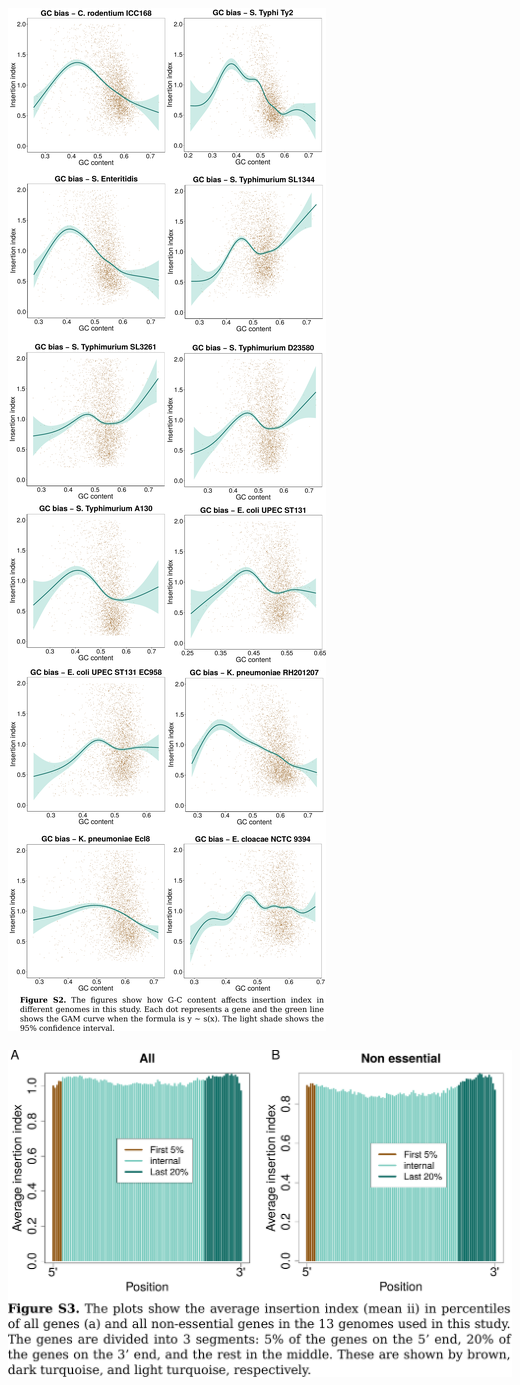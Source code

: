 \documentclass{article}
\newcommand{\Newpage}{\end{preview}\begin{preview}}
\begin{document}
\begin{preview}
\includegraphics{suppl2.pdf}
\Newpage
\includegraphics{suppl3.pdf}

\end{preview}
\end{document}
